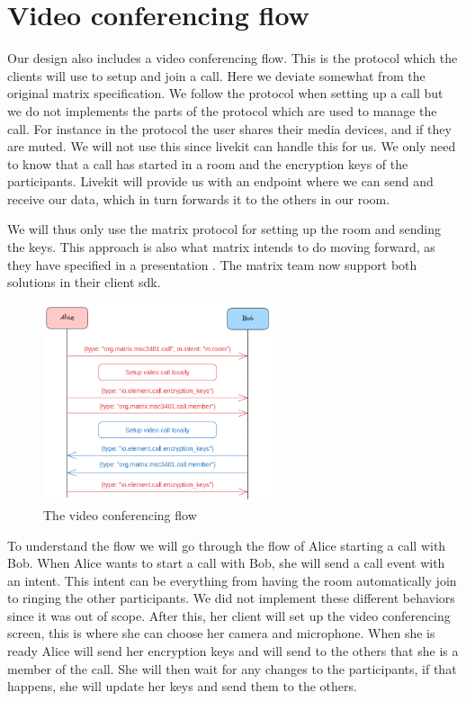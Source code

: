 \documentclass{report}
\begin{document}
\section{Video conferencing flow}
Our design also includes a video conferencing flow. This is the protocol which the clients will use to setup and
join a call. Here we deviate somewhat from the original matrix specification. We follow the protocol when setting up a
call but we do not implements the parts of the protocol which are used to manage the call. For instance in the protocol
the user shares their media devices, and if they are muted. We will not use this since livekit can handle this for
us. We only need to know that a call has started in a room and the encryption keys of the participants. Livekit will
provide us with an endpoint where we can send and receive our data, which in turn forwards it to the others in our room.

We will thus only use the matrix protocol for setting up the room and sending the keys. This approach is also what
matrix intends to do moving forward, as they have specified in a presentation . The
matrix team now support both solutions in their client sdk.

\begin{figure}
\centering
\includegraphics[width=0.6\textwidth]{img/Callflow.excalidraw.png}
\caption{The video conferencing flow}
\label{fig:video-conference-flow}
\end{figure}

To understand the flow we will go through the flow of Alice starting a call with Bob.
When Alice wants to start a call with Bob, she will send a call event with an intent. This intent can be
everything from having the room automatically join to ringing the other participants. We did not implement
these different behaviors since it was out of scope. After this, her client will set up the video conferencing
screen, this is where she can choose her camera and microphone. When she is ready Alice will send her encryption
keys and will send to the others that she is a member of the call. She will then wait for any changes to the
participants,
    if that happens, she will update her keys and send them to the others.
\end{document}
